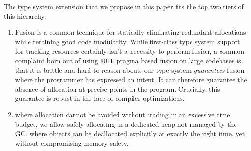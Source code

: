 \documentclass[11pt]{article}
\begin{document}
The type system extension that we propose in this paper fits the top
two tiers of this hierarchy:
\begin{enumerate}
\item Fusion is a common technique for statically eliminating
  redundant allocations while retaining good code modularity. While
  first-class type system support for tracking resources certainly
  isn't a necessity to perform fusion, a common complaint born out of
  using \verb|RULE| pragma based fusion on large codebases is that it
  is brittle and hard to reason about. our type system {\em
    guarantees} fusion where the programmer has expressed an intent.
  It can therefore guarantee the absence of allocation at precise
  points in the program. Crucially, this guarantee is robust in the
  face of compiler optimizations.
\item where allocation cannot be avoided without trading in an
  excessive time budget, we allow safely allocating in a dedicated
  heap not managed by the GC, where objects can be deallocated
  explicitly at exactly the right time, yet without compromising
  memory safety.
\end{enumerate}
\end{document}
